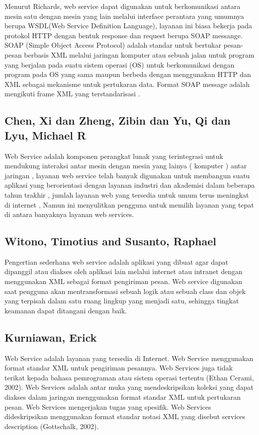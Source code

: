 \documentclass[12pt]{journal}
\begin{document}
Menurut Richards, web service dapat digunakan untuk berkomunikasi antara mesin satu dengan mesin yang lain melalui interface perantara yang umumnya berupa WSDL(Web Service Definition Language), layanan ini biasa bekerja pada protokol HTTP dengan bentuk response dan request berupa SOAP messange. SOAP (Simple Object Access Protocol) adalah standar untuk bertukar pesan-pesan berbasis XML melalui jaringan komputer atau sebuah jalan untuk program yang berjalan pada suatu sistem operasi (OS) untuk berkomunikasi dengan program pada OS yang sama maupun berbeda dengan menggunakan HTTP dan XML sebagai mekanisme untuk pertukaran data. Format SOAP message adalah mengikuti frame XML yang terstandarisasi \cite{ihya2011pembuatan}. 

\subsection{Chen, Xi dan Zheng, Zibin dan Yu, Qi dan Lyu, Michael R}

Web Service adalah komponen perangkat lunak yang terintegrasi untuk mendukung interaksi antar mesin dengan mesin yang lainya ( komputer ) antar jaringan , layanan web service telah banyak digunakan untuk membangun suatu aplikasi yang berorientasi dengan layanan industri dan akademisi dalam beberapa tahun trakhir , jumlah layanan web yang tersedia untuk umum terus meningkat di internet , Namun  ini menyulitkan pengguna untuk memilih layanan yang tepat di antara banyaknya layanan web services\cite{chen2014web}.

\subsection{Witono, Timotius and Susanto, Raphael}

Pengertian sederhana web service adalah aplikasi yang dibuat agar dapat dipanggil atau diakses oleh aplikasi lain melalui internet atau intranet dengan menggunakan XML sebagai format pengiriman pesan. Web service digunakan saat pengguna akan mentransformasi sebuah logik atau sebuah class dan objek yang terpisah dalam satu ruang lingkup yang menjadi satu, sehingga tingkat keamanan dapat ditangani dengan baik\cite{witono201511}.

\subsection{Kurniawan, Erick}

Web Service adalah layanan yang tersedia di Internet. Web Service menggunakan format standar XML untuk pengiriman pesannya. Web Services juga tidak terikat kepada bahasa pemrograman atau sistem operasi tertentu (Ethan Cerami, 2002). Web Services adalah antar muka yang mendeskripsikan koleksi yang dapat diakses dalam jaringan menggunakan format standar XML untuk pertukaran pesan. Web Services mengerjakan tugas yang spesifik. Web Services dideskripsikan menggunakan format standar notasi XML yang disebut services description (Gottschalk, 2002)\cite{chen2014web}.
\end{document}
